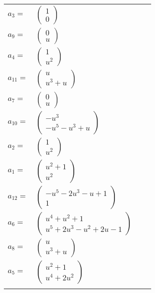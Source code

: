 \documentclass[1p]{elsarticle_modified}
\theoremstyle{definition}
\begin{document}
\begin{tabular}{m{7pt} m{180pt} m{7pt} m{180pt} }
\flushright $a_{3}=$&$\begin{pmatrix}1\\0\end{pmatrix}$ \\
\flushright $a_{9}=$&$\begin{pmatrix}0\\u\end{pmatrix}$ \\
\flushright $a_{4}=$&$\begin{pmatrix}1\\u^2\end{pmatrix}$ \\
\flushright $a_{11}=$&$\begin{pmatrix}u\\u^3+u\end{pmatrix}$ \\
\flushright $a_{7}=$&$\begin{pmatrix}0\\u\end{pmatrix}$ \\
\flushright $a_{10}=$&$\begin{pmatrix}- u^3\\- u^5- u^3+u\end{pmatrix}$ \\
\flushright $a_{2}=$&$\begin{pmatrix}1\\u^2\end{pmatrix}$ \\
\flushright $a_{1}=$&$\begin{pmatrix}u^2+1\\u^2\end{pmatrix}$ \\
\flushright $a_{12}=$&$\begin{pmatrix}- u^5-2 u^3- u+1\\1\end{pmatrix}$ \\
\flushright $a_{6}=$&$\begin{pmatrix}u^4+u^2+1\\u^5+2 u^3- u^2+2 u-1\end{pmatrix}$ \\
\flushright $a_{8}=$&$\begin{pmatrix}u\\u^3+u\end{pmatrix}$ \\
\flushright $a_{5}=$&$\begin{pmatrix}u^2+1\\u^4+2 u^2\end{pmatrix}$\\&\end{tabular}
\end{document}
